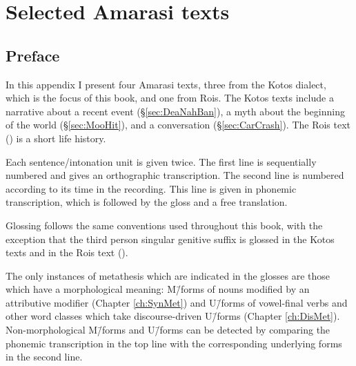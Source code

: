 \chapter{Selected Amarasi texts}\label{app:SelAmaTex}


\section{Preface}
In this appendix I present four Amarasi texts,
three from the Kotos dialect,
which is the focus of this book, and one from Ro{\Q}is.
The Kotos texts include a narrative about a recent event (\S\ref{sec:DeaNahBan}),
a myth about the beginning of the world (\S\ref{sec:MooHit}),
and a conversation (\S\ref{sec:CarCrash}).
The Ro{\Q}is text () is a short life history.

Each sentence/intonation unit is given twice.
The first line is sequentially numbered and gives an orthographic transcription.
The second line is numbered according to its time in the recording.
This line is given in phonemic transcription,
which is followed by the gloss and a free translation.

Glossing follows the same conventions used throughout this book,
with the exception that the third person singular genitive
suffix  is glossed  in the Kotos texts
and  in the Ro{\Q}is text ().

The only instances of metathesis which are indicated in the glosses
are those which have a morphological meaning:
M\=/forms of nouns modified by an attributive modifier (Chapter \ref{ch:SynMet})
and U\=/forms of vowel-final verbs and other word classes
which take discourse-driven U\=/forms (Chapter \ref{ch:DisMet}).
Non-morphological M\=/forms and U\=/forms
can be detected by comparing the phonemic transcription in the top line
with the corresponding underlying forms in the second line.

\renewcommand{\N}{\tsc{3gen}}





